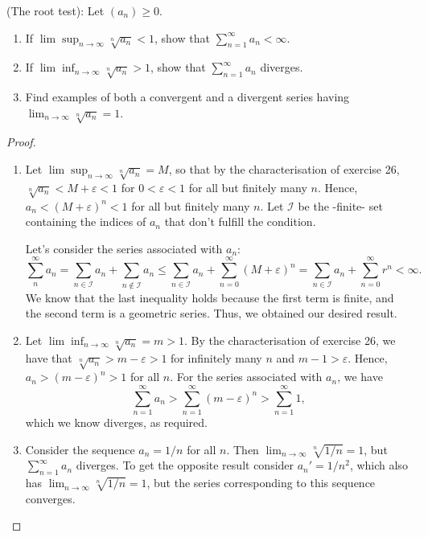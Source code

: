 \begin{exercise}{36}
(The root test): Let $(a_n)\geq 0$.
\begin{enumerate}
    \item If $\lim\sup_{n\to\infty}\sqrt[n]{a_n}<1$, show that $\sum_{n=1}^\infty a_n<\infty$.
    \item If $\lim\inf_{n\to\infty}\sqrt[n]{a_n}>1$, show that $\sum_{n=1}^\infty a_n$ diverges.
    \item Find examples of both a convergent and a divergent series having $\lim_{n\to\infty}\sqrt[n]{a_n} = 1$.
\end{enumerate}
\end{exercise}
\begin{proof}
\begin{enumerate}
    \item Let $\lim\sup_{n\to\infty}\sqrt[n]{a_n}=M$, so that by the characterisation of exercise 26, $\sqrt[n]{a_n}<M+\varepsilon<1$ for $0<\varepsilon<1$ for all but finitely many $n$. Hence, $a_n<(M+\varepsilon)^n<1$ for all but finitely many $n$. Let $\mathcal{I}$ be the -finite- set containing the indices of $a_n$ that don't fulfill the condition.

    Let's consider the series associated with $a_n$:
    \[
    \sum_n^\infty a_n = \sum_{n\in\mathcal{I}}a_n + \sum_{n\notin\mathcal{I}}a_n \leq \sum_{n\in\mathcal{I}}a_n + \sum_{n=0}^\infty (M+\varepsilon)^n = \sum_{n\in\mathcal{I}}a_n + \sum_{n=0}^\infty r^n <\infty.
    \]
    We know that the last inequality holds because the first term is finite, and the second term is a geometric series. Thus, we obtained our desired result.
    \item Let $\lim\inf_{n\to\infty}\sqrt[n]{a_n}=m>1$. By the characterisation of exercise 26, we have that $\sqrt[n]{a_n}>m-\varepsilon>1$ for infinitely many $n$ and $m-1>\varepsilon$. Hence, $a_n>(m-\varepsilon)^n>1$ for all $n$. For the series associated with $a_n$, we have
    \[
    \sum_{n=1}^\infty a_n > \sum_{n=1}^\infty (m-\varepsilon)^n >\sum_{n=1}^\infty 1,
    \]
    which we know diverges, as required.
    \item Consider the sequence $a_n=1/n$ for all $n$. Then $\lim_{n\to\infty}\sqrt[n]{1/n}=1$, but $\sum_{n=1}^\infty a_n$ diverges. To get the opposite result consider $a_n'=1/n^2$, which also has $\lim_{n\to\infty}\sqrt[n]{1/n}=1$, but the series corresponding to this sequence converges.
\end{enumerate}
\end{proof}

